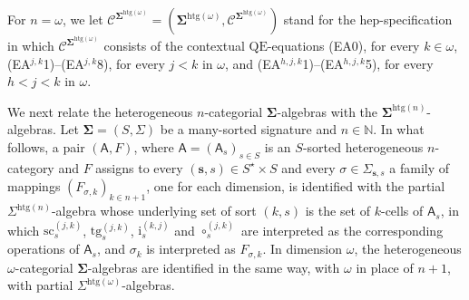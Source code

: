\documentclass[a4paper, reqno]{amsbook}
\newcommand{\sig}[1]{\mathbf{#1}}             %
\newcommand{\spec}[1]{\boldsymbol{\mathcal{#1}}} %
\newcommand{\QE}{\mathrm{QE}}
\newcommand{\htg}{\mathrm{htg}}                %
\newcommand{\src}{\mathrm{sc}}
\newcommand{\tgt}{\mathrm{tg}}
\theoremstyle{plain}
\theoremstyle{definition}
\begin{document}
For $n=\omega$, we let $\spec{C}^{\sig{\Sigma}^{\htg(\omega)}}=(\sig{\Sigma}^{\htg(\omega)},\mathcal{C}^{\sig{\Sigma}^{\htg(\omega)}})$ stand for the hep-specification in which $\mathcal{C}^{\sig{\Sigma}^{\htg(\omega)}}$ consists of the contextual $\QE$-equations (EA0), for every $k\in\omega$, (EA$^{j,k}$1)--(EA$^{j,k}$8), for every $j<k$ in $\omega$, and (EA$^{h,j,k}$1)--(EA$^{h,j,k}$5), for every $h<j<k$ in $\omega$.

We next relate the heterogeneous $n$-categorial $\sig{\Sigma}$-algebras with the $\sig{\Sigma}^{\htg(n)}$-algebras.
Let $\sig{\Sigma}=(S,\Sigma)$ be a many-sorted signature and $n\in\mathbb{N}$.
In what follows, a pair $(\mathsf{A},F)$, where $\mathsf{A}=(\mathsf{A}_{s})_{s\in S}$ is an $S$-sorted heterogeneous $n$-category and $F$ assigns to every $(\mathbf{s},s)\in S^{\star}\times S$ and every $\sigma\in\Sigma_{\mathbf{s},s}$ a family of mappings $(F_{\sigma,k})_{k\in n+1}$, one for each dimension, is identified with the partial $\Sigma^{\htg(n)}$-algebra whose underlying set of sort $(k,s)$ is the set of $k$-cells of $\mathsf{A}_{s}$, in which $\src^{(j,k)}_{s}$, $\tgt^{(j,k)}_{s}$, $\mathrm{i}^{(k,j)}_{s}$ and $\circ^{(j,k)}_{s}$ are interpreted as the corresponding operations of $\mathsf{A}_{s}$, and $\sigma_{k}$ is interpreted as $F_{\sigma,k}$.
In dimension $\omega$, the heterogeneous $\omega$-categorial $\sig{\Sigma}$-algebras are identified in the same way, with $\omega$ in place of $n+1$, with partial $\Sigma^{\htg(\omega)}$-algebras.
\end{document}
